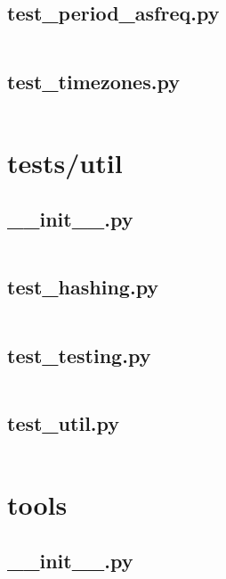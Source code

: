 \documentclass{article}
\begin{document}
\subsection{test\_period\_asfreq.py}
\inputminted{python}{/home/dufferzafar/dev/@clones/pandas/pandas/tests/tslibs/test_period_asfreq.py}
\newpage

\subsection{test\_timezones.py}
\inputminted{python}{/home/dufferzafar/dev/@clones/pandas/pandas/tests/tslibs/test_timezones.py}
\newpage

\section{tests/util}

\subsection{\_\_init\_\_.py}
\inputminted{python}{/home/dufferzafar/dev/@clones/pandas/pandas/tests/util/__init__.py}
\newpage

\subsection{test\_hashing.py}
\inputminted{python}{/home/dufferzafar/dev/@clones/pandas/pandas/tests/util/test_hashing.py}
\newpage

\subsection{test\_testing.py}
\inputminted{python}{/home/dufferzafar/dev/@clones/pandas/pandas/tests/util/test_testing.py}
\newpage

\subsection{test\_util.py}
\inputminted{python}{/home/dufferzafar/dev/@clones/pandas/pandas/tests/util/test_util.py}
\newpage

\section{tools}

\subsection{\_\_init\_\_.py}
\inputminted{python}{/home/dufferzafar/dev/@clones/pandas/pandas/tools/__init__.py}
\newpage
\end{document}
